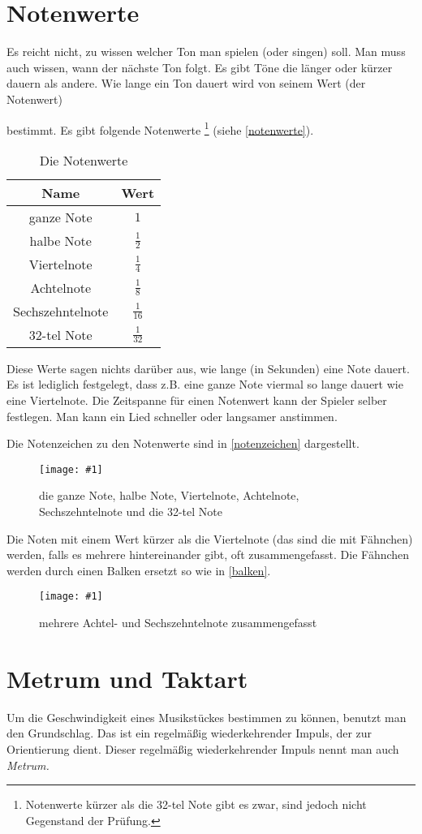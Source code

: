 \documentclass[10pt,a4paper,twoside]{report}
\newcommand{\comment}[1]{
	\marginpar{
		\textsf{#1}
	}
}
\newcommand{\image}[4]{
	\begin{figure}[!ht]
		\centering
		\texttt{[image: \#1]}
		\caption{#2}
		\label{#3}
	\end{figure}
}
\begin{document}
\section{Notenwerte}
Es reicht nicht, zu wissen welcher Ton man spielen (oder singen) soll. Man
muss auch wissen, wann der nächste Ton folgt. Es gibt Töne die 
länger oder kürzer
dauern als andere. Wie lange ein Ton dauert 
wird von seinem Wert (der Notenwert)\comment{Notenwert $\rightarrow$ Dauer}
bestimmt. Es gibt folgende Notenwerte%
\footnote{Notenwerte 
kürzer als die 32-tel Note gibt es zwar, sind jedoch 
nicht Gegenstand der Prüfung.}
(siehe \autoref{notenwerte}).
\begin{table}[!ht]
	\centering
	\begin{tabular}{|c|c|}
	\hline \textbf{Name} & \textbf{Wert} \\
	\hline ganze Note & $1$ \\ 
	\hline halbe Note & $\frac{1}{2}$ \\ 
	\hline Viertelnote & $\frac{1}{4}$ \\ 
	\hline Achtelnote & $ \frac{1}{8} $ \\ 
	\hline Sechszehntelnote & $ \frac{1}{16} $ \\ 
	\hline 32-tel Note & $ \frac{1}{32} $ \\ 
	\hline 
	\end{tabular} 
	\caption{Die Notenwerte}
	\label{notenwerte}
\end{table}

Diese Werte sagen nichts darüber aus, wie lange (in Sekunden) eine Note dauert. 
Es ist lediglich festgelegt, dass z.B. eine ganze Note 
viermal so lange dauert wie eine
Viertelnote. Die Zeitspanne für einen Notenwert kann der Spieler selber 
festlegen. Man kann ein Lied schneller oder langsamer anstimmen.

Die Notenzeichen zu den Notenwerte sind in \autoref{notenzeichen} dargestellt.%
\image{lilypond/notenwerte.png}{die ganze Note, halbe Note, Viertelnote,
Achtelnote, Sechszehntelnote und die 32-tel Note}{notenzeichen}{8}
Die Noten mit einem Wert kürzer als die Viertelnote (das sind die mit Fähnchen) 
werden, falls es mehrere hintereinander gibt, oft zusammengefasst. 
Die Fähnchen werden 
durch einen Balken ersetzt so wie in \autoref{balken}.
\image{lilypond/balken.png}{mehrere Achtel- und Sechszehntelnote zusammengefasst}{balken}{6.5}

\section{Metrum und Taktart}
Um die Geschwindigkeit eines Musikstückes bestimmen zu können, benutzt man
den Grundschlag. Das ist ein regelmäßig wiederkehrender Impuls, der zur
Orientierung dient. \comment{Metrum}Dieser regelmäßig 
wiederkehrender Impuls nennt man auch \emph{Metrum.}
\end{document}
